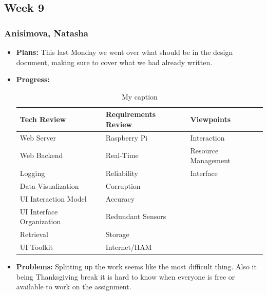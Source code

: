\documentclass[10pt,draftclsnofoot,onecolumn]{IEEEtran}
\begin{document}
\subsection{Week 9}
\subsubsection{Anisimova, Natasha}
\begin{itemize}
	\item \textbf{Plans: }
	This last Monday we went over what should be in the design document, making sure to cover what we had already written.
	\item \textbf{Progress: }
	\begin{table}[htbp!]
		\centering
		\caption{My caption}
		\label{my-label}
		\begin{tabular}{lll}
			\hline
			\multicolumn{1}{|l|}{Tech Review} & \multicolumn{1}{l|}{Requirements Review} & \multicolumn{1}{l|}{Viewpoints}  \\ \hline
			\multicolumn{1}{|l|}{Web Server}  & \multicolumn{1}{l|}{Raspberry Pi}        & \multicolumn{1}{l|}{Interaction} \\ \hline
			Web Backend                       & Real-Time                                & Resource Management              \\
			Logging                           & Reliability                              & Interface                        \\
			Data Visualization                & Corruption                               &                                  \\
			UI Interaction Model              & Accuracy                                 &                                  \\
			UI Interface Organization         & Redundant Sensors                        &                                  \\
			Retrieval                         & Storage                                  &                                  \\
			UI Toolkit                        & Internet/HAM                             &
		\end{tabular}
	\end{table}

	\item \textbf{Problems: }
	Splitting up the work seems like the most difficult thing. Also it being Thanksgiving break it is hard to know when everyone is free or available to work on the assignment.
\end{itemize}
\end{document}
